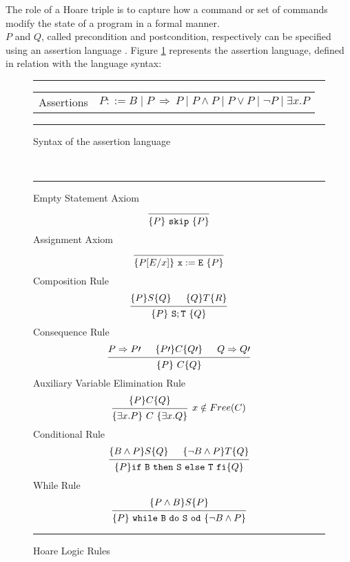 \documentclass[12pt,a4paper]{article}
\begin{document}
The role of a Hoare triple is to capture how a command or set of commands modify the state of a program in a formal manner. \\

\(P\) and \(Q\), called precondition and postcondition, respectively can be specified using an assertion language . Figure \ref{fig:assertionSyntax} represents the assertion language, defined in relation with the language syntax: 
\vspace{1cm}
\begin{figure}[h]
	\noindent\rule{\linewidth}{0.4pt}
	\begin{tabularx}{\linewidth}{l  X}
		Assertions& \(P ::= B \mid P\ \Rightarrow\ P \mid P \land P \mid P \lor P \mid \neg P \mid {\exists x . P} \) \\
	\end{tabularx}
	\caption{Syntax of the assertion language}
	\noindent\rule{\linewidth}{0.4pt}
	\label{fig:assertionSyntax}
\end{figure}
\\

\begin{figure}[h!]
	\noindent\rule{\linewidth}{0.4pt}
	Empty Statement Axiom
	\[
	\begin{prooftree}
	\Hypo{}
	\Infer 1 {\{P\}\  \mathtt{skip}\  \{P\}}
	\end{prooftree}	
	\]
	Assignment Axiom 
	\medskip
	\[
	\begin{prooftree}
	\Hypo{}
	\Infer 1 {\{P[E/x]\}\  \mathtt{x := E}\  \{P\}}
	\end{prooftree}	
	\]
	Composition Rule
	\medskip
	\[
	\begin{prooftree}
	\Hypo{ \{P\} S \{Q\}}
	\Hypo{ \{Q\} T \{R\}}
	\Infer 2 {\{P\}\  \mathtt{S ; T}\  \{Q\}}
	\end{prooftree}	
	\]
	Consequence Rule
	\medskip
	\[
	\begin{prooftree}
	\Hypo{P \Rightarrow P\prime}
	\Hypo{\{P\prime\} C \{Q\prime\}}
	\Hypo{Q \Rightarrow Q\prime}
	\Infer 3 {\{P\}\  C  \{Q\}}
	\end{prooftree}	
	\]
	Auxiliary Variable Elimination Rule
	\medskip
	\[
	\begin{prooftree}
	\Hypo{\{P\} C \{Q\}}
	\Infer 1 [\(x \notin Free(C)\)]{\{\exists x.P\}\ C\ \{\exists x. Q\}}
	\end{prooftree}	
	\]
	Conditional Rule
	\medskip
	\[
	\begin{prooftree}
	\Hypo{\{B \land P\} S \{Q\}}
	\Hypo{\{\neg B \land P\} T \{Q\}}
	\Infer 2 {\{P\} \mathtt{if\ B\ then\ S\ else\ T\ fi} \{Q\}}
	\end{prooftree}	
	\]
	While Rule
	\medskip
	\[
	\begin{prooftree}
	\Hypo{\{P \land B\} S\{P\}}
	\Infer 1 {\{P\}\  \mathtt{while\ B\ do\ S\ od}\  \{\neg B \land P\}}
	\end{prooftree}	
	\]
	\caption{Hoare Logic Rules}
	\label{fig:HLRules}
	\noindent\rule{\linewidth}{0.4pt}
\end{figure}
\end{document}
